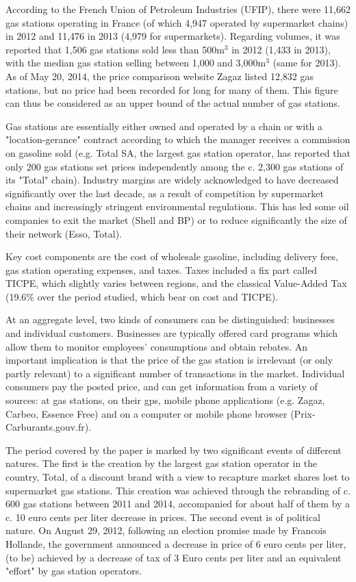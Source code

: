\documentclass[english]{article}
\begin{document}
According to the French Union of Petroleum Industries (UFIP), there were 11,662 gas stations operating in France (of which 4,947 operated by supermarket chains) in 2012 and 11,476 in 2013 (4,979 for supermarkets). Regarding volumes, it was reported that 1,506 gas stations sold less than 500m$^{3}$ in 2012 (1,433 in 2013), with the median gas station selling between 1,000 and 3,000m$^{3}$ (same for 2013). As of May 20, 2014, the price comparison website Zagaz listed 12,832 gas stations, but no price had been recorded for long for many of them. This figure can thus be considered as an upper bound of the actual number of gas stations.

Gas stations are essentially either owned and operated by a chain or with a "location-gerance" contract according to which the manager receives a commission on gasoline sold (e.g. Total SA, the largest gas station operator, has reported that only 200 gas stations set prices independently among the c. 2,300 gas stations of its "Total" chain). Industry margins are widely acknowledged to have decreased significantly over the last decade, as a result of competition by supermarket chains and increasingly stringent environmental regulations. This has led some oil companies to exit the market (Shell and BP) or to reduce significantly the size of their network (Esso, Total).

Key cost components are the cost of wholesale gasoline, including delivery fees,  gas station operating expenses, and taxes. Taxes included a fix part called TICPE, which slightly varies between regions, and the classical Value-Added Tax (19.6\% over the period studied, which bear on cost and TICPE).

At an aggregate level, two kinds of consumers can be distinguished: businesses and individual customers. Businesses are typically offered card programs which allow them to monitor employees' consumptions and obtain rebates. An important implication is that the price of the gas station is irrelevant (or only partly relevant) to a significant number of transactions in the market. Individual consumers pay the posted price, and can get information from a variety of sources: at gas stations, on their gps, mobile phone applications (e.g. Zagaz, Carbeo, Essence Free) and on a computer or mobile phone browser (Prix-Carburants.gouv.fr).

The period covered by the paper is marked by two significant events of different natures. The first is the creation by the largest gas station operator in the country, Total, of a discount brand with a view to recapture market shares lost to supermarket gas stations. This creation was achieved through the rebranding of c. 600 gas stations between 2011 and 2014, accompanied for about half of them by a c. 10 euro cents per liter decrease in prices. The second event is of political nature. On August 29, 2012, following an election promise made by Francois Hollande, the government announced a decrease in price of 6 euro cents per liter, (to be) achieved by a decrease of tax of 3 Euro cents per liter and an equivalent "effort" by gas station operators.
\end{document}
